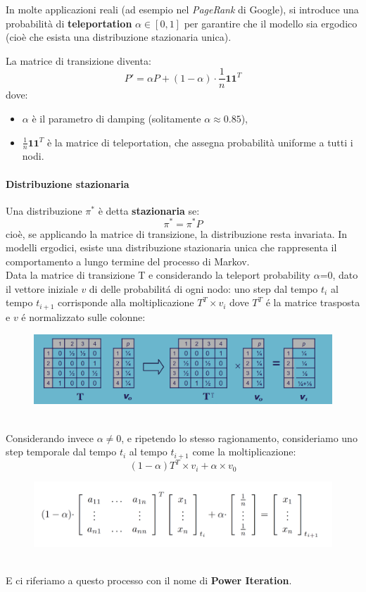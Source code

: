 In molte applicazioni reali (ad esempio nel \textit{PageRank} di Google), si introduce una probabilità di \textbf{teleportation} $\alpha \in [0,1]$ per garantire che il modello sia ergodico (cioè che esista una distribuzione stazionaria unica).

La matrice di transizione diventa:
\[
P' = \alpha P + (1 - \alpha) \cdot \frac{1}{n} \mathbf{1} \mathbf{1}^T
\]
dove:
\begin{itemize}
    \item $\alpha$ è il parametro di damping (solitamente $\alpha \approx 0.85$),
    \item $\frac{1}{n} \mathbf{1} \mathbf{1}^T$ è la matrice di teleportation, che assegna probabilità uniforme a tutti i nodi.
\end{itemize}

\paragraph{Distribuzione stazionaria}

Una distribuzione $\pi^*$ è detta \textbf{stazionaria} se:
\[
\pi^* = \pi^* P
\]
cioè, se applicando la matrice di transizione, la distribuzione resta invariata. In modelli ergodici, esiste una distribuzione stazionaria unica che rappresenta il comportamento a lungo termine del processo di Markov.
\\
\newpage
Data la matrice di transizione T e considerando la teleport probability $\alpha$=0, dato il vettore iniziale $v$ di delle probabilitá di ogni nodo: uno step dal tempo $t_i$ al tempo $t_{i+1}$ corrisponde alla moltiplicazione $T^T\times v_i$ dove $T^T$ é la matrice trasposta e $v$ é normalizzato sulle colonne:
\\
\begin{figure}[th]
    \centering
    \includegraphics[scale=0.3]{GraphImportance//img/markov.png}
\end{figure}
\\
Considerando invece $\alpha \neq 0$, e ripetendo lo stesso ragionamento, consideriamo uno step temporale dal tempo $t_i$ al tempo $t_{i+1}$ come la moltiplicazione:
\\
\[
(1-\alpha)T^T\times v_i + \alpha \times v_0
\]
\begin{figure}[th]
    \centering
    \includegraphics[scale=0.4]{GraphImportance//img/poweriteration.png}
\end{figure}
\\
E ci riferiamo a questo processo con il nome di \textbf{Power Iteration}. 
\newpage
